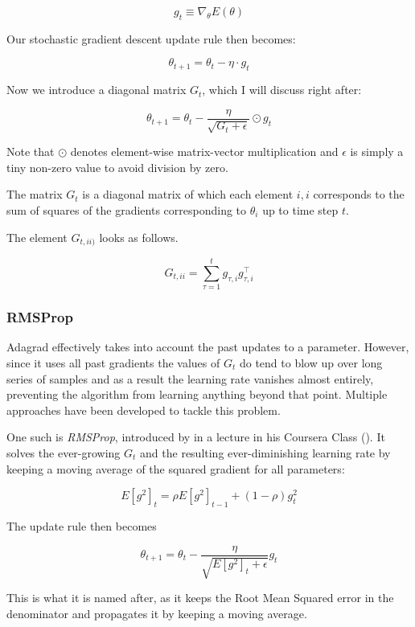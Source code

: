 \begin{equation}
  g_{t} \equiv \nabla_\theta E(\theta)
\end{equation}

Our stochastic gradient descent update rule then becomes:

\begin{equation}
  \theta_{t+1} = \theta_{t} - \eta \cdot g_{t}
\end{equation}

Now we introduce a diagonal matrix $G_t$,
which I will discuss right after:

\begin{equation}
  \theta_{t+1} = \theta_{t} - \frac{\eta}{\sqrt{G_t + \epsilon}} \odot g_{t}
\end{equation}

Note that $\odot$ denotes element-wise matrix-vector multiplication
and $\epsilon$ is simply a tiny non-zero value
to avoid division by zero.

The matrix $G_t$ is a diagonal matrix
of which each element $i,i$
corresponds to the sum of squares of the gradients
corresponding to $\theta_i$
up to time step $t$.

The element $G_{t, ii)}$ looks as follows.

\begin{equation}
  G_{t, ii} = \sum^t_{\tau=1}g_{\tau, i} g_{\tau, i}^\top
\end{equation}

\subsubsection{RMSProp}
Adagrad effectively takes into account
the past updates to a parameter.
However, since it uses all past gradients
the values of $G_t$ do tend to blow up over long
series of samples
and as a result the learning rate vanishes almost entirely,
preventing the algorithm from learning anything beyond that point.
Multiple approaches have been developed to tackle this problem.

One such is \textit{RMSProp},
introduced by \citeauthor{hinton2012neural}
in a lecture in his Coursera Class (\citeyear{hinton2012neural}).
It solves the ever-growing $G_t$
and the resulting ever-diminishing learning rate
by keeping a moving average of the squared gradient for all parameters:

\begin{equation}
  E[g^2]_t = \rho E[g^2]_{t-1} + (1-\rho) g^2_t
\end{equation}

The update rule then becomes

\begin{equation}
  \label{eq:rmsprop}
  \theta_{t+1} = \theta_{t} - \frac{\eta}{\sqrt{E[g^2]_t + \epsilon}} g_{t}
\end{equation}

This is what it is named after,
as it keeps the Root Mean Squared error in the denominator
and propagates it by keeping a moving average.
